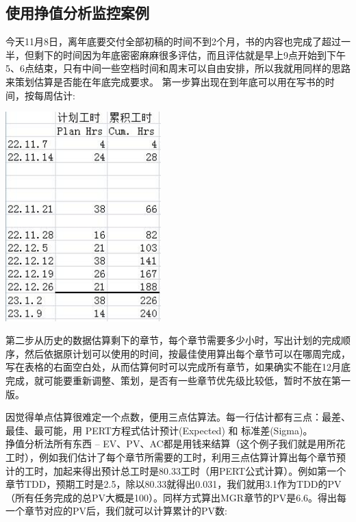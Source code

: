 \hypertarget{ux4f7fux7528pspux6323ux503cux5206ux6790ux76d1ux63a7ux6848ux4f8b}{%
\subsection{使用挣值分析监控案例}\label{ux4f7fux7528pspux6323ux503cux5206ux6790ux76d1ux63a7ux6848ux4f8b}}

今天11月8日，离年底要交付全部初稿的时间不到2个月，书的内容也完成了超过一半，但剩下的时间因为年底密密麻麻很多评估，而且评估就是早上9点开始到下午5、6点结束，只有中间一些空档时间和周末可以自由安排，所以我就用同样的思路来策划估算是否能在年底完成要求。
第一步算出现在到年底可以用在写书的时间，按每周估计:


\includegraphics[width=6cm]{psp3.jpg}

第二步从历史的数据估算剩下的章节，每个章节需要多少小时，写出计划的完成顺序，然后依据原计划可以使用的时间，按最佳使用算出每个章节可以在哪周完成，写在表格的右面空白处，从而估算何时可以完成所有章节，如果确实不能在12月底完成，就可能要重新调整、策划，是否有一些章节优先级比较低，暂时不放在第一版。

因觉得单点估算很难定一个点数，便用三点估算法。每一行估计都有三点：最差、最佳、最可能，用
PERT方程式估计预计(Expected) 和 标准差(Sigma)。\\
挣值分析法所有东西 --
EV、PV、AC都是用钱来结算（这个例子我们就是用所花工时），例如我们估计了每个章节所需要的工时，利用三点估算计算出每个章节预计的工时，加起来得出预计总工时是80.33工时（用PERT公式计算）。例如第一个章节TDD，预期工时是2.5，除以80.33就得出0.031，我们就用3.1作为TDD的PV（所有任务完成的总PV大概是100）。同样方式算出MGR章节的PV是6.6。得出每一个章节对应的PV后，我们就可以计算累计的PV数:


